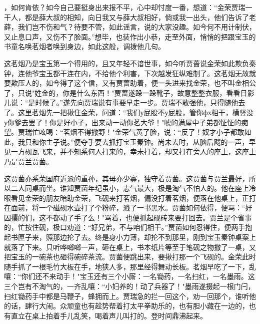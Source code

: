 ，如何肯依？如今自己要挺身出来报不平，心中却忖度一番，想道：“金荣贾瑞一干人，都是薛大叔的相知，向日我又与薛大叔相好，倘或我一出头，他们告诉了老薛，我们岂不伤和气？待要不管，如此谣言，说的大家没趣。如今何不用计制伏，又止息口声，又伤不了脸面。”想毕，也装作出小恭，走至外面，悄悄的把跟宝玉的书童名唤茗烟者唤到身边，如此这般，调拨他几句。

这茗烟乃是宝玉第一个得用的，且又年轻不谙世事，如今听贾蔷说金荣如此欺负秦钟，连他爷宝玉都干连在内，不给他个利害，下次越发狂纵难制了。这茗烟无故就要欺压人的，如今得了这个信，又有贾蔷助着，便一头进来找金荣，也不叫金相公了，只说"姓金的，你是什么东西！"贾蔷遂跺一跺靴子，故意整整衣服，看看日影儿说：“是时候了。”遂先向贾瑞说有事要早走一步。贾瑞不敢强他，只得随他去了。这里茗烟先一把揪住金荣，问道：“我们у屁股不у屁股，管你фх相干，横竖没у你爹去罢了！你是好小子，出来动一动你茗大爷！"唬的满屋中子弟都怔怔的痴望。贾瑞忙吆喝：“茗烟不得撒野！"金荣气黄了脸，说：“反了！奴才小子都敢如此，我只和你主子说。”便夺手要去抓打宝玉秦钟。尚未去时，从脑后飕的一声，早见一方砚瓦飞来，并不知系何人打来的，幸未打着，却又打在旁人的座上，这座上乃是贾兰贾菌。

这贾菌亦系荣国府近派的重孙，其母亦少寡，独守着贾菌。这贾菌与贾兰最好，所以二人同桌而坐。谁知贾菌年纪虽小，志气最大，极是淘气不怕人的。他在座上冷眼看见金荣的朋友暗助金荣，飞砚来打茗烟，偏没打着茗烟，便落在他桌上，正打在面前，将一个磁砚水壶打了个粉碎，溅了一书黑水。贾菌如何依得，便骂：“好囚攮的们，这不都动了手了么！"骂着，也便抓起砚砖来要打回去。贾兰是个省事的，忙按住砚，极口劝道：“好兄弟，不与咱们相干。”贾菌如何忍得住，便两手抱起书匣子来，照那边抡了去。终是身小力薄，却抡不到那里，刚到宝玉秦钟桌案上就落了下来。只听哗啷啷一声，砸在桌上，书本纸片等至于笔砚之物撒了一桌，又把宝玉的一碗茶也砸得碗碎茶流。贾菌便跳出来，要揪打那一个飞砚的。金荣此时随手抓了一根毛竹大板在手，地狭人多，那里经得舞动长板。茗烟早吃了一下，乱嚷：“你们还不来动手！"宝玉还有三个小厮：一名锄药，一名扫红，一名墨雨。这三个岂有不淘气的，一齐乱嚷：“小妇养的！动了兵器了！"墨雨遂掇起一根门闩，扫红锄药手中都是马鞭子，蜂拥而上。贾瑞急的拦一回这个，劝一回那个，谁听他的话，肆行大闹。众顽童也有趁势帮着打太平拳助乐的，也有胆小藏在一边的，也有直立在桌上拍着手儿乱笑，喝着声儿叫打的。登时间鼎沸起来。

